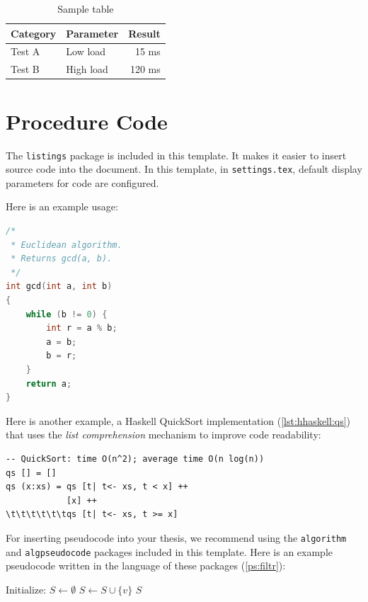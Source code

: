 \begin{table}[htbp]
  \caption{Sample table }
  \centering
  \begin{tabular}{|l|l|r|}
    \hline
    \textbf{Category} & \textbf{Parameter} & \textbf{Result} \\
    \hline
    Test A & Low load & 15 ms \\
    Test B & High load & 120 ms \\
    \hline
  \end{tabular}
  \label{tab:example}
\end{table}

\section{Procedure Code}

The \texttt{listings} package is included in this template.
It makes it easier to insert source code into the document. In this template, in \texttt{settings.tex},
default display parameters for code are configured.

Here is an example usage:

\begin{lstlisting}[language=C,
caption={Euclidean algorithm in C},
label={lst:hello}]
/*
 * Euclidean algorithm.
 * Returns gcd(a, b).
 */
int gcd(int a, int b)
{
    while (b != 0) {
        int r = a % b;
        a = b;
        b = r;
    }
    return a;
}
\end{lstlisting}

Here is another example, a Haskell QuickSort implementation (\cref{lst:hhaskell:qs}) that uses
the \textit{list comprehension} mechanism to improve code readability: \par

\begin{lstlisting}[style=haskellStyle, %language=haskell,
caption={QuickSort algorithm in Haskell},
label={lst:hhaskell:qs}]
-- QuickSort: time O(n^2); average time O(n log(n))
qs [] = []
qs (x:xs) = qs [t| t<- xs, t < x] ++
            [x] ++
\t\t\t\t\t\tqs [t| t<- xs, t >= x]
\end{lstlisting}


For inserting pseudocode into your thesis, we recommend using the \texttt{algorithm} and \texttt{algpseudocode} packages included in this template.
Here is an example pseudocode written in the language of these packages (\cref{ps:filtr}):


\begin{algorithm}[H]
\caption{Filtering}
\label{ps:filtr}
\begin{algorithmic}[1]
\State Initialize: $S \gets \emptyset$
    \State $S \gets S \cup \{v\}$ 
  \EndIf
\EndFor
\State \Return $S$
\end{algorithmic}
\end{algorithm}

